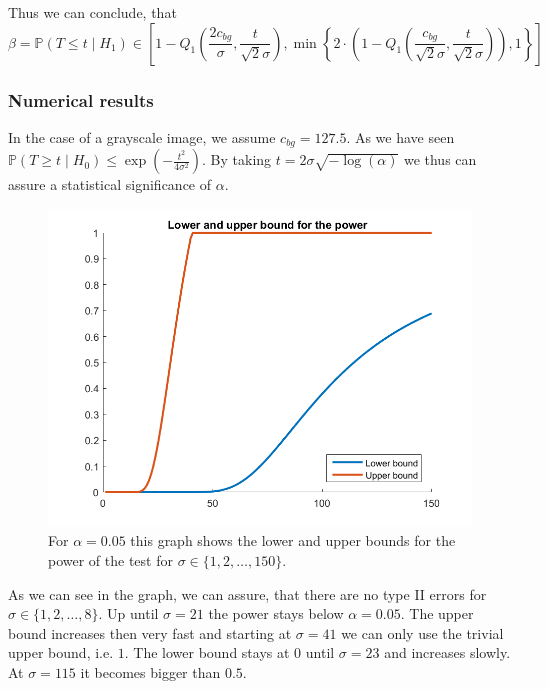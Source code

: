 \documentclass[a4paper,12pt]{article}
\theoremstyle{plain}
\theoremstyle{definition}
\theoremstyle{remark}
\begin{document}
Thus we can conclude, that
\begin{equation*}
	\beta = \mathbb{P}(T \leq t \mid H_1) \in \left[ 1 - Q_1 \left( \frac{2 c_{bg}}{\sigma}, \frac{t}{\sqrt{2} \sigma} \right), \min \left\{ 2 \cdot \left( 1 - Q_1 \left( \frac{c_{bg}}{\sqrt{2} \sigma}, \frac{t}{\sqrt{2} \sigma} \right) \right), 1 \right\} \right]
\end{equation*}

\subsubsection{Numerical results}

In the case of a grayscale image, we assume $c_{bg} = 127.5$. As we have seen $\mathbb{P}(T \geq t \mid H_0) \leq \exp \left( - \frac{t^2}{4 \sigma^2} \right)$. By taking $t = 2 \sigma \sqrt{- \log(\alpha)}$ we thus can assure a statistical significance of $\alpha$.

\begin{figure}[h]
	\includegraphics[width=\linewidth]{Power_Bounds}
	\caption[Power bounds]{For $\alpha = 0.05$ this graph shows the lower and upper bounds for the power of the test for $\sigma \in \{ 1, 2, \dots, 150 \}$.}
	\label{fig:demo1comparison}
\end{figure}

As we can see in the graph, we can assure, that there are no type II errors for $\sigma \in \{ 1, 2, \dots, 8 \}$. Up until $\sigma = 21$ the power stays below $\alpha = 0.05$. The upper bound increases then very fast and starting at $\sigma = 41$ we can only use the trivial upper bound, i.e. $1$. The lower bound stays at $0$ until $\sigma = 23$ and increases slowly. At $\sigma = 115$ it becomes bigger than $0.5$.
\end{document}
